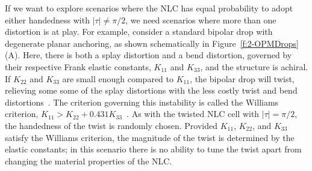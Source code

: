 If we want to explore scenarios where the NLC has equal probability to adopt either handedness with $|\tau| \neq \pi/2$, we need scenarios where more than one distortion is at play.
For example, consider a standard bipolar drop with degenerate planar anchoring, as shown schematically in Figure~\ref{f:2-OPMDrops}(A).
Here, there is both a splay distortion and a bend distortion, governed by their respective Frank elastic constants, $K_{11}$ and $K_{33}$, and the structure is achiral.
If $K_{22}$ and $K_{33}$ are small enough compared to $K_{11}$, the bipolar drop will twist, relieving some some of the splay distortions with the less costly twist and bend distortions~\cite{RN297,RN296,RN295}.
The criterion governing this instability is called the Williams criterion, $K_{11} > K_{22}+ 0.431 K_{33}$~\cite{RN297}.
As with the twisted NLC cell with $|\tau| = \pi/2$, the handedness of the twist is randomly chosen.
Provided $K_{11}$, $K_{22}$, and $K_{33}$ satisfy the Williams criterion, the magnitude of the twist is determined by the elastic constants; in this scenario there is no ability to tune the twist apart from changing the material properties of the NLC.

